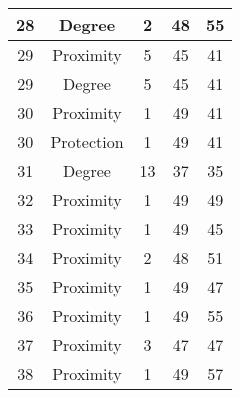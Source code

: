 \documentclass[results.tex]{subfiles}
\begin{document}
\begin{center}
\begin{tabular}{| c || c | c | c | c |}
            \hline
            28                      & Degree                       & 2                      & 48                      & 55                   \\
            \hline
            29                      & Proximity                    & 5                      & 45                      & 41                   \\
            \hline
            29                      & Degree                       & 5                      & 45                      & 41                   \\
            \hline
            30                      & Proximity                    & 1                      & 49                      & 41                   \\
            \hline
            30                      & Protection                   & 1                      & 49                      & 41                   \\
            \hline
            31                      & Degree                       & 13                     & 37                      & 35                   \\
            \hline
            32                      & Proximity                    & 1                      & 49                      & 49                   \\
            \hline
            33                      & Proximity                    & 1                      & 49                      & 45                   \\
            \hline
            34                      & Proximity                    & 2                      & 48                      & 51                   \\
            \hline
            35                      & Proximity                    & 1                      & 49                      & 47                   \\
            \hline
            36                      & Proximity                    & 1                      & 49                      & 55                   \\
            \hline
            37                      & Proximity                    & 3                      & 47                      & 47                   \\
            \hline
            38                      & Proximity                    & 1                      & 49                      & 57                   \\

\end{tabular}
\end{center}
\end{document}
